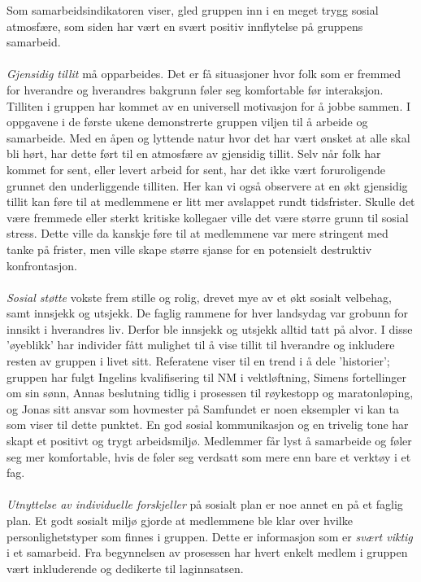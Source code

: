 Som samarbeidsindikatoren viser, gled gruppen inn i en meget trygg sosial atmosfære, som siden har vært en svært positiv innflytelse på gruppens samarbeid.\\
\\
\emph{Gjensidig tillit} må opparbeides. 
Det er få situasjoner hvor folk som er fremmed for hverandre og hverandres bakgrunn føler seg komfortable før interaksjon.
Tilliten i gruppen har kommet av en universell motivasjon for å jobbe sammen. 
I oppgavene i de første ukene demonstrerte gruppen viljen til å  arbeide og samarbeide.
Med en åpen og lyttende natur hvor det har vært ønsket at alle skal bli hørt, har dette ført til en atmosfære av gjensidig tillit. 
Selv når folk har kommet for sent, eller levert arbeid for sent, har det ikke vært foruroligende grunnet den underliggende tilliten.
Her kan vi også observere at en økt gjensidig tillit kan føre til at medlemmene er litt mer avslappet rundt tidsfrister.
Skulle det være fremmede eller sterkt kritiske kollegaer ville det være større grunn til sosial stress.
Dette ville da kanskje føre til at medlemmene var mere stringent med tanke på frister, men ville skape større sjanse for en potensielt destruktiv konfrontasjon.\\
\\
\emph{Sosial støtte} vokste frem stille og rolig, drevet mye av et økt sosialt velbehag, samt innsjekk og utsjekk. 
De faglig rammene for hver landsydag var grobunn for innsikt i hverandres liv. 
Derfor ble innsjekk og utsjekk alltid tatt på alvor. 
I disse 'øyeblikk' har individer fått mulighet til å vise tillit til hverandre og inkludere resten av gruppen i livet sitt. Referatene viser til en trend i å dele 'historier'; gruppen har fulgt Ingelins kvalifisering til NM i vektløftning, Simens fortellinger om sin sønn, Annas beslutning tidlig i prosessen til røykestopp og maratonløping, og Jonas sitt ansvar som hovmester på Samfundet er noen eksempler vi kan ta som viser til dette punktet.
En god sosial kommunikasjon og en trivelig tone har skapt et positivt og trygt arbeidsmiljø\cite{happy}.
Medlemmer får lyst å samarbeide og føler seg mer komfortable, hvis de føler seg verdsatt som mere enn bare et verktøy i et fag.\\
\\
\emph{Utnyttelse av individuelle forskjeller} på sosialt plan er noe annet en på et faglig plan.
Et godt sosialt miljø gjorde at medlemmene ble klar over hvilke personlighetstyper som finnes i gruppen.
Dette er informasjon som er \emph{svært viktig} i et samarbeid.
Fra begynnelsen av prosessen har hvert enkelt medlem i gruppen vært inkluderende og dedikerte til laginnsatsen. 
